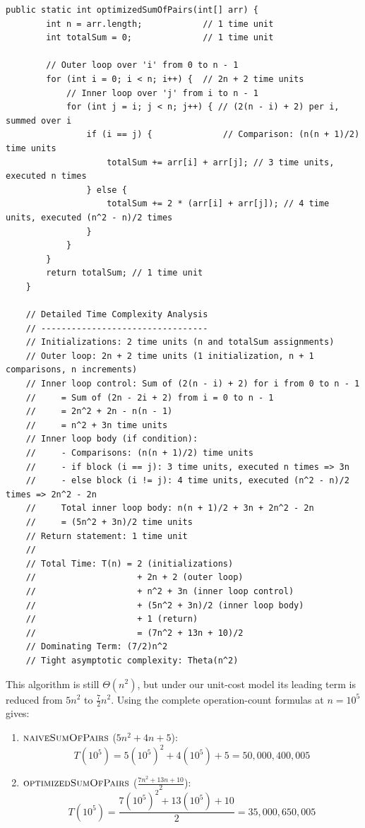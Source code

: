 \begin{lstlisting}[style = javaStyle, caption={Optimized Sum of Pairs with Analysis}, label={lst:java_optimized_sum_pairs_analysis}]
    public static int optimizedSumOfPairs(int[] arr) {
        int n = arr.length;            // 1 time unit
        int totalSum = 0;              // 1 time unit
    
        // Outer loop over 'i' from 0 to n - 1
        for (int i = 0; i < n; i++) {  // 2n + 2 time units
            // Inner loop over 'j' from i to n - 1
            for (int j = i; j < n; j++) { // (2(n - i) + 2) per i, summed over i
                if (i == j) {              // Comparison: (n(n + 1)/2) time units
                    totalSum += arr[i] + arr[j]; // 3 time units, executed n times
                } else {
                    totalSum += 2 * (arr[i] + arr[j]); // 4 time units, executed (n^2 - n)/2 times
                }
            }
        }
        return totalSum; // 1 time unit
    }
    
    // Detailed Time Complexity Analysis
    // ---------------------------------
    // Initializations: 2 time units (n and totalSum assignments)
    // Outer loop: 2n + 2 time units (1 initialization, n + 1 comparisons, n increments)
    // Inner loop control: Sum of (2(n - i) + 2) for i from 0 to n - 1
    //     = Sum of (2n - 2i + 2) from i = 0 to n - 1
    //     = 2n^2 + 2n - n(n - 1)
    //     = n^2 + 3n time units
    // Inner loop body (if condition): 
    //     - Comparisons: (n(n + 1)/2) time units
    //     - if block (i == j): 3 time units, executed n times => 3n
    //     - else block (i != j): 4 time units, executed (n^2 - n)/2 times => 2n^2 - 2n
    //     Total inner loop body: n(n + 1)/2 + 3n + 2n^2 - 2n
    //     = (5n^2 + 3n)/2 time units
    // Return statement: 1 time unit
    //
    // Total Time: T(n) = 2 (initializations)
    //                    + 2n + 2 (outer loop)
    //                    + n^2 + 3n (inner loop control)
    //                    + (5n^2 + 3n)/2 (inner loop body)
    //                    + 1 (return)
    //                    = (7n^2 + 13n + 10)/2
    // Dominating Term: (7/2)n^2
    // Tight asymptotic complexity: Theta(n^2)
\end{lstlisting}

This algorithm is still $\Theta(n^2)$, but under our unit-cost model its leading term is reduced from $5n^2$ to $\tfrac{7}{2}n^2$. Using the complete operation-count formulas at $n=10^5$ gives:

\begin{enumerate}
    \item $\proc{naiveSumOfPairs}$ (\(5n^2+4n+5\)):
    \[
    T(10^5)=5(10^5)^2+4(10^5)+5=50,000,400,005
    \]

    \item $\proc{optimizedSumOfPairs}$ (\(\tfrac{7n^2+13n+10}{2}\)):
    \[
    T(10^5)=\frac{7(10^5)^2+13(10^5)+10}{2}=35,000,650,005
    \]
\end{enumerate}

